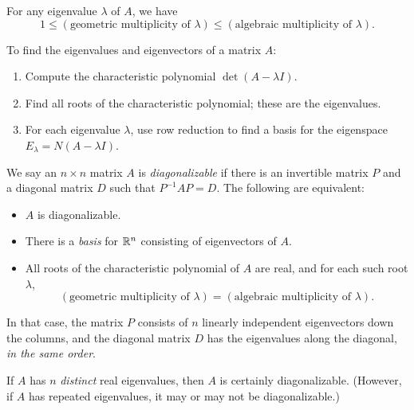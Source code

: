 \begin{fact}
	For any eigenvalue $\lambda$ of $A$, we have
	\[
		1 \leq (\text{geometric multiplicity of $\lambda$}) \leq (\text{algebraic
		multiplicity of $\lambda$}).
	\]
\end{fact}

\begin{fact}
	To find the eigenvalues and eigenvectors of a matrix $A$:
	\begin{enumerate}
		\item Compute the characteristic polynomial $\det(A - \lambda I)$.
		\item Find all roots of the characteristic polynomial; these are the
			eigenvalues.
		\item For each eigenvalue $\lambda$, use row reduction to find a basis for
			the eigenspace $E_\lambda = N(A - \lambda I)$.
	\end{enumerate}
\end{fact}

\begin{definition}
	We say an $n \times n$ matrix $A$ is \emph{diagonalizable} if there is an
	invertible matrix $P$ and a diagonal matrix $D$ such that $P^{-1}AP = D$. The
	following are equivalent:
	\begin{itemize}
		\item $A$ is diagonalizable.
		\item There is a \emph{basis} for ${\mathbb{R}}^n$ consisting of eigenvectors of $A$.
		\item All roots of the characteristic polynomial of $A$ are real, and for
			each such root $\lambda$,
			\[
				(\text{geometric multiplicity of $\lambda$}) = (\text{algebraic
				multiplicity of $\lambda$}).
			\]
	\end{itemize}
	In that case, the matrix $P$ consists of $n$ linearly independent eigenvectors
	down the columns, and the diagonal matrix $D$ has the eigenvalues along the
	diagonal, \emph{in the same order}.
\end{definition}

\begin{fact}
	If $A$ has $n$ \emph{distinct} real eigenvalues, then $A$ is certainly
	diagonalizable. (However, if $A$ has repeated eigenvalues, it may or may not
	be diagonalizable.)
\end{fact}
